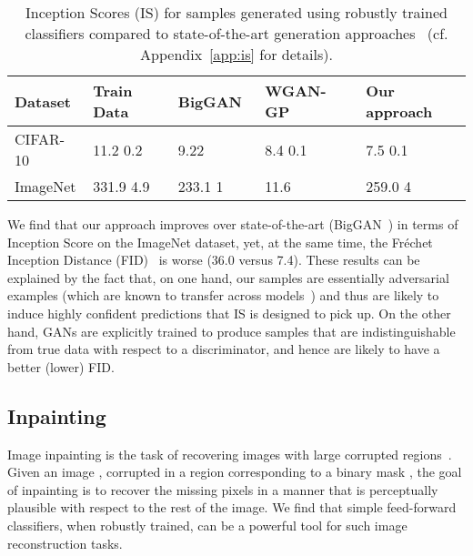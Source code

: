 \documentclass{article}
\begin{document}
{\renewcommand{\arraystretch}{1}\begin{table}[!h]
	\caption{Inception Scores (IS) for samples generated using robustly trained
	classifiers compared to state-of-the-art 
	generation approaches~\cite{gulrajani2017improved,shmelkov2018good, brock2019large} (cf. Appendix~\ref{app:is} 
	for details).}
\begin{tabular}{P{2.3cm}|P{2.3cm}P{2.3cm}P{2.35cm}P{2.6cm} }
	\toprule
    Dataset & Train Data & BigGAN~\cite{brock2019large} &
        WGAN-GP~\cite{gulrajani2017improved} & {Our approach} \\
	\midrule
	CIFAR-10   & 11.2  0.2    & 9.22 &    8.4  0.1 & {7.5  0.1} \\
	ImageNet\footnotemark &   331.9  4.9  & 233.1  1    & 11.6 & {259.0  4} \\
	\bottomrule
\end{tabular}
\label{tab:inception_score}
\end{table}

We find that our approach improves over state-of-the-art
(BigGAN~\cite{brock2019large}) in
terms of Inception Score on the ImageNet dataset, yet, at the same time, the
Fr\'echet Inception Distance (FID)~\cite{heusel2017gans} is worse
(36.0 versus 7.4). These results can be explained by the fact that, on one hand, our samples are essentially adversarial examples (which are
known to transfer across models~\cite{szegedy2014intriguing}) and thus are likely
to induce highly confident predictions that IS is designed to pick up. On the other hand, GANs are explicitly trained to produce samples that are indistinguishable from true data with respect to a discriminator, and hence are likely to have a better (lower) FID.





 
\subsection{Inpainting}
\label{sec:inpainting}
Image inpainting is the task of recovering images with large 
corrupted regions~\cite{efros1999texture,bertalmio2000image,hays2007scene}.
Given an image , corrupted in a region 
corresponding to a binary mask , the goal 
of inpainting is to recover the missing pixels in a manner that is perceptually
plausible with respect to the rest of the image.
We find that simple feed-forward classifiers,
when robustly trained, can be a powerful tool for such image 
reconstruction tasks. 

}
\end{document}
